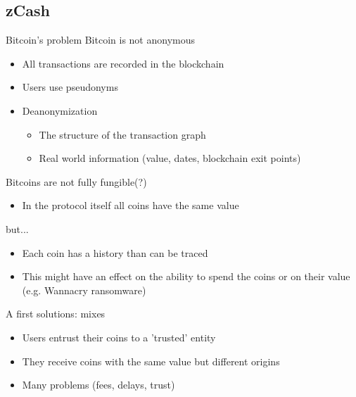 \documentclass[handouts]{beamer}
\begin{document}
\subsection{zCash}
\begin{frame}[allowframebreaks]{Bitcoin's problem}
    Bitcoin is not anonymous  
    \begin{itemize}
        \item All transactions are recorded in the blockchain  
        \item Users use pseudonyms  
        \item Deanonymization  
        \begin{itemize}
            \item The structure of the transaction graph  
            \item Real world information (value, dates, blockchain exit points)  
        \end{itemize} 
    \end{itemize}
    Bitcoins are not fully fungible(?)  
    \begin{itemize}
        \item In the protocol itself all coins have the same value
    \end{itemize}
    
    but...
    \framebreak 
   
    \begin{itemize}
        \item Each coin has a history than can be traced  
        \item This might have an effect on the ability to spend the coins or on their value (e.g. Wannacry ransomware)  
    \end{itemize}

    A first solutions: mixes  
    \begin{itemize}
        \item Users entrust their coins to a 'trusted' entity  
        \item They receive coins with the same value but different origins  
        \item Many problems (fees, delays, trust) 
    \end{itemize}
\end{frame}
\end{document}

